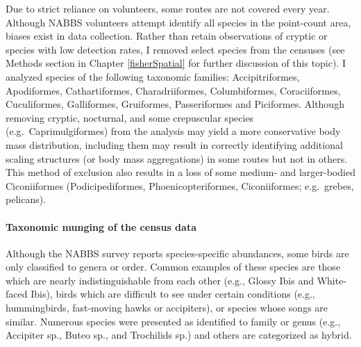 \documentclass[print]{nuthesis}
\begin{document}
Due to strict reliance on volunteers, some routes are not covered every year. Although NABBS volunteers attempt identify all species in the point-count area, biases exist in data collection. Rather than retain observations of cryptic or species with low detection rates, I removed select species from the censuses (see Methods section in Chapter \ref{fisherSpatial} for further discussion of this topic). I analyzed species of the following taxonomic families: Accipitriformes, Apodiformes, Cathartiformes, Charadriiformes, Columbiformes, Coraciiformes, Cuculiformes, Galliformes, Gruiformes, Passeriformes and Piciformes. Although removing cryptic, nocturnal, and some crepuscular species (e.g.~Caprimulgiformes) from the analysis may yield a more conservative body mass distribution, including them may result in correctly identifying additional scaling structures (or body mass aggregations) in some routes but not in others. This method of exclusion also results in a loss of some medium- and larger-bodied Ciconiiformes (Podicipediformes, Phoenicopteriformes, Ciconiiformes; e.g.~grebes, pelicans).

\hypertarget{taxonomic-munging-of-the-census-data}{%
\paragraph{Taxonomic munging of the census data}\label{taxonomic-munging-of-the-census-data}}

Although the NABBS survey reports species-specific abundances, some birds are only classified to genera or order. Common examples of these species are those which are nearly indistinguishable from each other (e.g., Glossy Ibis and White-faced Ibis), birds which are difficult to see under certain conditions (e.g., hummingbirds, fast-moving hawks or accipiters), or species whose songs are similar. Numerous species were presented as identified to family or genus (e.g., Accipiter sp., Buteo sp., and Trochilids sp.) and others are categorized as hybrid.
\end{document}
